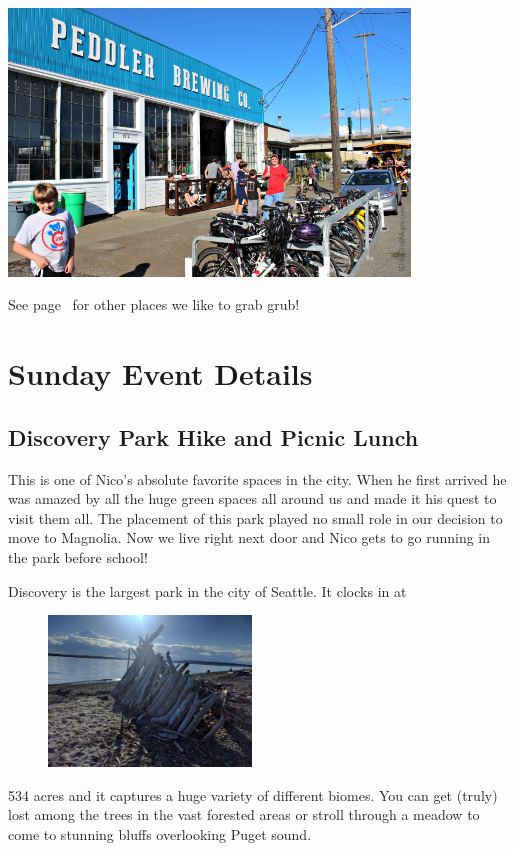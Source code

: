 \documentclass[12pt]{article}
\begin{document}
        \begin{center}
            \includegraphics[width=0.8\textwidth]{peddler}
        \end{center}
    
    See page~\pageref{subsec-bites} for other places we like to grab grub! 



\newpage
\section{Sunday Event Details}
\subsection{Discovery Park Hike and Picnic Lunch}
This is one of Nico's absolute favorite spaces in the city. When he first arrived he was amazed 
by all the huge green spaces all around us and made it his quest to visit them all. The placement of 
this park played no small role in our decision to move to Magnolia. Now we live right next door and Nico gets to go running in the park
before school!\hfill
\label{subsec-discovery}

Discovery is the largest park in the city of Seattle. It clocks in at  
\begin{figure}
    \begin{center}
        \includegraphics[width=0.48\textwidth]{leanto}
    \end{center}
\end{figure}
534 acres and it captures
a huge variety of different biomes. You can get (truly) lost among the trees in the vast
forested areas or stroll through a meadow to come to stunning bluffs overlooking Puget sound.
\end{document}
